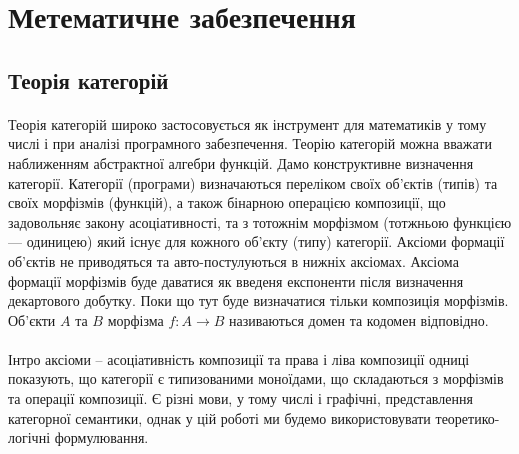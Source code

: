 \documentclass[11pt,oneside]{article}
\begin{document}
\section{Метематичне забезпечення}
\vspace{0.3cm}

\subsection{Теорія категорій}

    \paragraph{}
    Теорія категорій широко застосовується як інструмент для математиків у тому числі і
    при аналізі програмного забезпечення. Теорію категорій можна вважати наближенням абстрактної алгебри функцій.
    Дамо конструктивне визначення категорії.
    Категорії (програми) визначаються переліком своїх об’єктів (типів) та своїх
    морфізмів (функцій), а також бінарною операцією композиції,
    що задовольняє закону асоціативності, та з тотожнім морфізмом (тотжньою функцією --- одиницею) який існує
    для кожного об’єкту (типу) категорії. Аксіоми формації об’єктів не
    приводяться та авто-постулуються в нижніх аксіомах. Аксіома формації
    морфізмів буде даватися як введеня експоненти після визначення декартового добутку.
    Поки що тут буде визначатися тільки композиція морфізмів. Об’єкти $A$ та $B$ морфізма $f: A \rightarrow B$
    називаються домен та кодомен відповідно.

    \paragraph{}
    Інтро аксіоми -- асоціативність композиції та права і ліва композиції одниці показують,
    що категорії є типизованими моноїдами, що складаються з морфізмів та операції композиції.
    Є різні мови, у тому числі і графічні, представлення категорної семантики, однак у цій роботі
    ми будемо використовувати теоретико-логічні формулювання.
\end{document}
